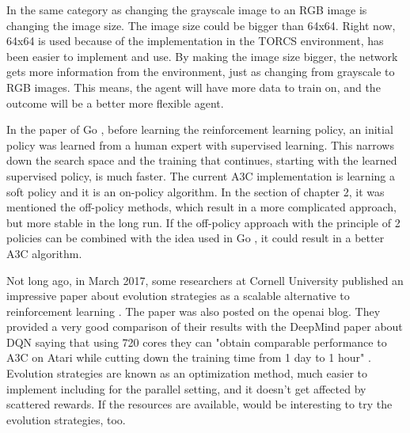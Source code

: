 In the same category as changing the grayscale image to an RGB image is changing the image size. The image size could be bigger than 64x64. Right now, 64x64 is used because of the implementation in the TORCS environment, has been easier to implement and use. By making the image size bigger, the network gets more information from the environment, just as changing from grayscale to RGB images. This means, the agent will have more data to train on, and the outcome will be a better more flexible agent.

In the paper of Go \cite{Silver_2016}, before learning the reinforcement learning policy, an initial policy was learned from a human expert with supervised learning. This narrows down the search space and the training that continues, starting with the learned supervised policy, is much faster. The current A3C implementation is learning a soft policy and it is an on-policy algorithm. In the  section of chapter 2, it was mentioned the off-policy methods, which result in a more complicated approach, but more stable in the long run. If the off-policy approach with the principle of 2 policies can be combined with the idea used in Go \cite{Silver_2016}, it could result in a better A3C algorithm.

Not long ago, in March 2017, some researchers at Cornell University published an impressive paper about evolution strategies as a scalable alternative to reinforcement learning \cite{EvolStrat}. The paper was also posted on the openai blog. They provided a very good comparison of their results with the DeepMind paper about DQN \cite{DBLP:journals/corr/MnihKSGAWR13} saying that using 720 cores they can "obtain comparable performance to A3C on Atari while cutting down the training time from 1 day to 1 hour" \cite{EvolStrat}. Evolution strategies are known as an optimization method, much easier to implement including for the parallel setting, and it doesn't get affected by scattered rewards. If the resources are available, would be interesting to try the evolution strategies, too.
